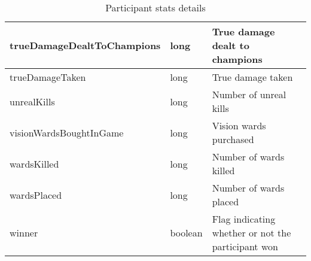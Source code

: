 \begin{table}[!htb]
\begin{tabular}{|llp{5cm}|}
trueDamageDealtToChampions      & long               & True damage dealt to champions                                                  \\ \hline
trueDamageTaken                 & long               & True damage taken                                                               \\ \hline
unrealKills                     & long               & Number of unreal kills                                                          \\ \hline
visionWardsBoughtInGame         & long               & Vision wards purchased                                                          \\ \hline
wardsKilled                     & long               & Number of wards killed                                                          \\ \hline
wardsPlaced                     & long               & Number of wards placed                                                          \\ \hline
winner                          & boolean            & Flag indicating whether or not the participant won                              \\ \hline
\end{tabular}
\caption{Participant stats details}\label{tab:part-stats}
\end{table}

\FloatBarrier
